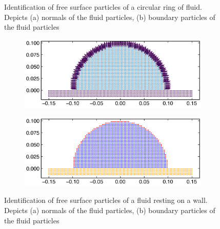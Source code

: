 \documentclass[preprint,12pt]{elsarticle}
\begin{document}
\begin{figure}[!htpb]
\begin{subfigure}{0.48\textwidth}
    \subcaption{}%
    \label{fig:free_surface_circle_boundary_particles}
  \end{subfigure}
  \caption{Identification of free surface particles of a circular ring of
    fluid. Depicts (a) normals of the fluid particles, (b) boundary particles
    of the fluid particles}
\label{fig:boundary-particles-circle}
\end{figure}
\begin{figure}[!htpb]
  \centering
  \begin{subfigure}{0.48\textwidth}
    \centering
    \includegraphics[width=1\linewidth]{fig_2_a}
    \subcaption{}%
    \label{fig:boundary-particles-circle-wall-normals}
  \end{subfigure}
  \begin{subfigure}{0.48\textwidth}
    \centering
    \includegraphics[width=1\linewidth]{fig_2_b}
    \subcaption{}%
    \label{fig:boundary-particles-circle-wall-bp}
  \end{subfigure}
  \caption{Identification of free surface particles of a fluid resting on a
    wall. Depicts (a) normals of the fluid particles, (b) boundary particles
    of the fluid particles}
\label{fig:boundary-particles-circle-wall}
\end{figure}
\end{document}
